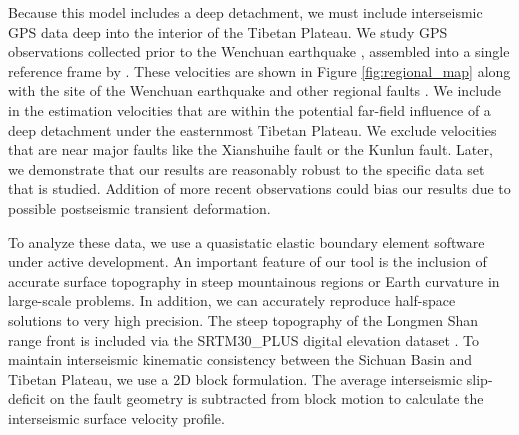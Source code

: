 \documentclass[12pt]{article}
\begin{document}
Because this model includes a deep detachment, we must include interseismic GPS data deep into the interior of the Tibetan Plateau. We study GPS observations collected prior to the Wenchuan earthquake \citep{apel06,Banerjee2008,calais06, gan07, vigny03}, assembled into a single reference frame by \citet{Loveless2011}. These velocities are shown in Figure \ref{fig:regional_map} along with the site of the Wenchuan earthquake and other regional faults \citep{Taylor09}. We include in the estimation velocities that are within the potential far-field influence of a deep detachment under the easternmost Tibetan Plateau. We exclude velocities that are near major faults like the Xianshuihe fault or the Kunlun fault. Later, we demonstrate that our results are reasonably robust to the specific data set that is studied. Addition of more recent observations could bias our results due to possible postseismic transient deformation.

To analyze these data, we use a quasistatic elastic boundary element software under active development. An important feature of our tool is the inclusion of accurate surface topography in steep mountainous regions or Earth curvature in large-scale problems. In addition, we can accurately reproduce half-space solutions to very high precision. The steep topography of the Longmen Shan range front is included via the SRTM30\_PLUS digital elevation dataset \citep{Becker2009}. To maintain interseismic kinematic consistency between the Sichuan Basin and Tibetan Plateau, we use a 2D block formulation. The average interseismic slip-deficit on the fault geometry is subtracted from block motion to calculate the interseismic surface velocity profile.
\end{document}
